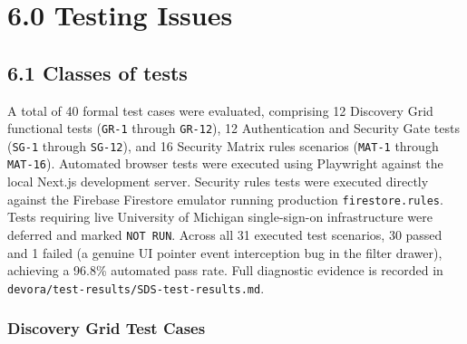 \documentclass[11pt,letterpaper]{article}
\begin{document}
\section*{6.0 Testing Issues}

\subsection*{6.1 Classes of tests}

A total of 40 formal test cases were evaluated, comprising 12 Discovery Grid functional tests (\texttt{GR-1} through \texttt{GR-12}), 12 Authentication and Security Gate tests (\texttt{SG-1} through \texttt{SG-12}), and 16 Security Matrix rules scenarios (\texttt{MAT-1} through \texttt{MAT-16}). Automated browser tests were executed using Playwright against the local Next.js development server. Security rules tests were executed directly against the Firebase Firestore emulator running production \texttt{firestore.rules}. Tests requiring live University of Michigan single-sign-on infrastructure were deferred and marked \texttt{NOT RUN}. Across all 31 executed test scenarios, 30 passed and 1 failed (a genuine UI pointer event interception bug in the filter drawer), achieving a 96.8\% automated pass rate. Full diagnostic evidence is recorded in \texttt{devora/test-results/SDS-test-results.md}.

\subsubsection*{Discovery Grid Test Cases}
\end{document}
